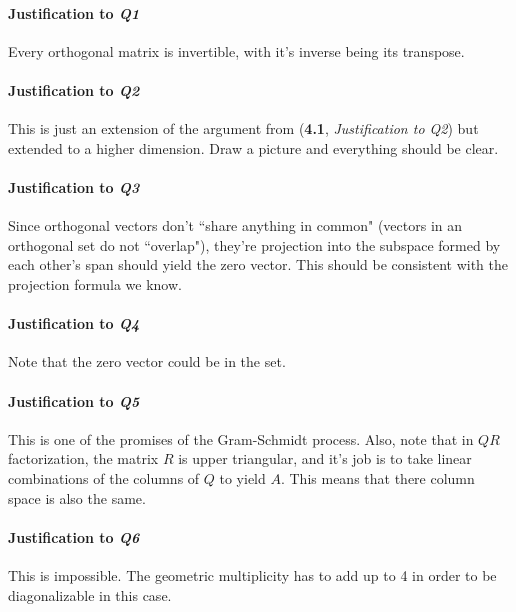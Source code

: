	\paragraph{Justification to \textit{Q1}} Every orthogonal matrix is invertible, with it's inverse being its transpose.
	
	\paragraph{Justification to \textit{Q2}} This is just an extension of the argument from (\textbf{4.1}, \textit{Justification to Q2}) but extended to a higher
			dimension. Draw a picture and everything should be clear.

	\paragraph{Justification to \textit{Q3}} Since orthogonal vectors don't ``share anything in common" (vectors in an orthogonal set do not ``overlap"), 
			they're projection into the subspace formed by each other's span should yield the zero vector. This should be consistent with the projection 
			formula we know.

	\paragraph{Justification to \textit{Q4}} Note that the zero vector could be in the set.

	\paragraph{Justification to \textit{Q5}} This is one of the promises of the Gram-Schmidt process. Also, note that in \(QR\) factorization, the matrix
			\(R\) is upper triangular, and it's job is to take linear combinations of the columns of \(Q\) to yield \(A\). This means that there column space is
			also the same.

	\paragraph{Justification to \textit{Q6}} This is impossible. The geometric multiplicity has to add up to 4 in order to be diagonalizable in this case.
